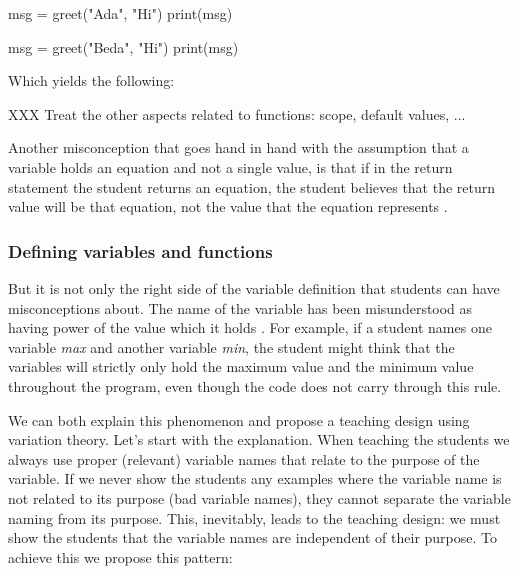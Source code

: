 \begin{description}
\begin{minipage}[t]{0.45\columnwidth}
\begin{pyblock}[funcG2]
msg = greet("Ada", "Hi")
print(msg)

msg = greet("Beda", "Hi")
print(msg)
      \end{pyblock}

      \vspace{0.5em}
      Which yields the following:
      \printpythontex[verbatim]
    \end{minipage}

\end{description}

XXX Treat the other aspects related to functions: scope, default values, ...

Another misconception that goes hand in hand with the assumption that a 
variable holds an equation and not a single value, is that if in the return 
statement the student returns an equation, the student believes that the return 
value will be that equation, not the value that the equation represents 
\parencite{Kohn2017VariableEvaluation}.


\subsubsection{Defining variables and functions}

But it is not only the right side of the variable definition that students 
can 
have misconceptions about. The name of the variable has been misunderstood 
as 
having power of the value which it holds 
\parencite{MisconceptionsSurvey2017,Sleeman1984}. For example, if a student 
names one variable \emph{max} and another variable \emph{min}, the student 
might think that the variables will strictly only hold the maximum value 
and 
the minimum value throughout the program, even though the code does not 
carry through this rule. 

We can both explain this phenomenon and propose a teaching design using 
variation theory.
Let's start with the explanation.
When teaching the students we always use proper (\ie relevant) variable 
names 
that relate to the purpose of the variable.
If we never show the students any examples where the variable name is not 
related to its purpose (bad variable names), they cannot separate the 
variable 
naming from its purpose.
This, inevitably, leads to the teaching design:
we must show the students that the variable names are independent of their 
purpose. To achieve this we propose this pattern:

